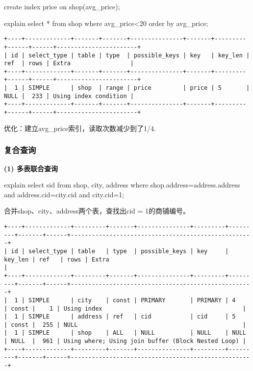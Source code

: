 \documentclass[a4paper, 11pt, nofonts, nocap, fancyhdr]{ctexart}
\begin{document}
create index price on shop(avg\_price);

explain select * from shop where avg\_price<20 order by avg\_price;

\begin{verbatim}
+----+-------------+-------+-------+---------------+-------+---------+------+------+-----------------------+
| id | select_type | table | type  | possible_keys | key   | key_len | ref  | rows | Extra                 |
+----+-------------+-------+-------+---------------+-------+---------+------+------+-----------------------+
|  1 | SIMPLE      | shop  | range | price         | price | 5       | NULL |  233 | Using index condition |
+----+-------------+-------+-------+---------------+-------+---------+------+------+-----------------------+
\end{verbatim}

优化：建立avg\_price索引，读取次数减少到了1/4.

\subsubsection{复合查询}

\textbf{(1) 多表联合查询} 

explain select sid from shop, city, address where shop.address=address.address and address.cid=city.cid and city.cid=1;

合并shop、city、address两个表，查找出cid = 1的商铺编号。

\begin{verbatim}
+----+-------------+---------+-------+---------------+---------+---------+-------+------+----------------------------------------------------+
| id | select_type | table   | type  | possible_keys | key     | key_len | ref   | rows | Extra                                              |
+----+-------------+---------+-------+---------------+---------+---------+-------+------+----------------------------------------------------+
|  1 | SIMPLE      | city    | const | PRIMARY       | PRIMARY | 4       | const |    1 | Using index                                        |
|  1 | SIMPLE      | address | ref   | cid           | cid     | 5       | const |  255 | NULL                                               |
|  1 | SIMPLE      | shop    | ALL   | NULL          | NULL    | NULL    | NULL  |  961 | Using where; Using join buffer (Block Nested Loop) |
+----+-------------+---------+-------+---------------+---------+---------+-------+------+----------------------------------------------------+
\end{verbatim}
\end{document}
